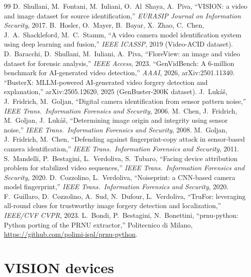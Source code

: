 \documentclass[11pt,a4paper]{article}
\begin{document}
\begin{thebibliography}{99}
 D.~Shullani, M.~Fontani, M.~Iuliani, O.~Al~Shaya, A.~Piva,
  ``VISION: a video and image dataset for source identification,''
  \emph{EURASIP Journal on Information Security}, 2017.
 B.~Hosler, O.~Mayer, B.~Bayar, X.~Zhao, C.~Chen, J.~A.~Shackleford, M.~C.~Stamm,
  ``A video camera model identification system using deep learning and fusion,''
  \emph{IEEE ICASSP}, 2019 (Video-ACID dataset).
 D.~Baracchi, D.~Shullani, M.~Iuliani, A.~Piva,
  ``FloreView: an image and video dataset for forensic analysis,'' \emph{IEEE Access}, 2023.
 ``GenVidBench: A 6-million benchmark for AI-generated video detection,''
  \emph{AAAI}, 2026, arXiv:2501.11340.
 ``BusterX: MLLM-powered AI-generated video forgery detection and explanation,''
  arXiv:2505.12620, 2025 (GenBuster-200K dataset).
 J.~Luk\'a\v{s}, J.~Fridrich, M.~Goljan,
  ``Digital camera identification from sensor pattern noise,''
  \emph{IEEE Trans.\ Information Forensics and Security}, 2006.
 M.~Chen, J.~Fridrich, M.~Goljan, J.~Luk\'a\v{s},
  ``Determining image origin and integrity using sensor noise,''
  \emph{IEEE Trans.\ Information Forensics and Security}, 2008.
 M.~Goljan, J.~Fridrich, M.~Chen,
  ``Defending against fingerprint-copy attack in sensor-based camera identification,''
  \emph{IEEE Trans.\ Information Forensics and Security}, 2011.
 S.~Mandelli, P.~Bestagini, L.~Verdoliva, S.~Tubaro,
  ``Facing device attribution problem for stabilized video sequences,''
  \emph{IEEE Trans.\ Information Forensics and Security}, 2020.
 D.~Cozzolino, L.~Verdoliva,
  ``Noiseprint: a CNN-based camera model fingerprint,''
  \emph{IEEE Trans.\ Information Forensics and Security}, 2020.
 F.~Guillaro, D.~Cozzolino, A.~Sud, N.~Dufour, L.~Verdoliva,
  ``TruFor: leveraging all-round clues for trustworthy image forgery detection and localization,''
  \emph{IEEE/CVF CVPR}, 2023.
 L.~Bondi, P.~Bestagini, N.~Bonettini,
  ``prnu-python: Python porting of the PRNU extractor,'' Politecnico di Milano,
  \url{https://github.com/polimi-ispl/prnu-python}.
\end{thebibliography}

\appendix
\section{VISION devices}
\label{app:vision}
\end{document}
